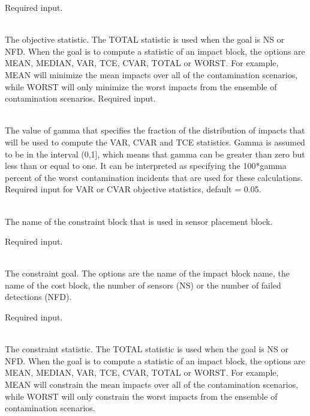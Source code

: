 \begin{description}[topsep=0pt,parsep=0.5em,itemsep=-0.4em]
\begin{description}[topsep=0pt,parsep=0.5em,itemsep=-0.4em]
				Required input.
    \item[{statistic}]\hfill
      \\The objective statistic. The TOTAL
      statistic is used when the goal is NS                             or
      NFD. When the goal is to compute a                             statistic
      of an impact block, the options                             are MEAN,
      MEDIAN, VAR, TCE, CVAR, TOTAL                             or WORST. For
      example, MEAN will minimize                             the mean impacts
      over all of the                             contamination scenarios,
      while WORST                             will only minimize the worst
      impacts                             from the ensemble of contamination
      scenarios.                                  Required input.
    \item[{gamma}]\hfill
      \\The value of gamma that specifies the                 fraction of the
      distribution of impacts that will                 be used to compute the
      VAR, CVAR and TCE statistics.                 Gamma is assumed to be in
      the interval (0,1], which means                  that gamma can be
      greater than zero but less than or equal to one. It                 can
      be interpreted as specifying the 100*gamma                 percent of
      the worst contamination incidents that                 are used for
      these calculations.                  Required input for VAR or CVAR
      objective statistics,                 default = 0.05.
  \end{description}
  \item[{constraint}]\hfill
  \begin{description}[topsep=0pt,parsep=0.5em,itemsep=-0.4em]
    \item[{name}]\hfill
\\The name of the constraint block that is used in sensor placement block.
                
                Required input.
    \item[{goal}]\hfill
\\The constraint goal. The options are the name of the impact block name, 
                the name of the cost block, the number of sensors (NS) or the number of failed detections (NFD).
                
                Required input.
    \item[{statistic}]\hfill
\\The constraint statistic. The TOTAL
                statistic is used when the goal is NS
                or NFD. When the goal is to compute a
                statistic of an impact block, the options
                are MEAN, MEDIAN, VAR, TCE, CVAR, TOTAL
                or WORST. For example, MEAN will constrain
                the mean impacts over all of the
                contamination scenarios, while WORST
                will only constrain the worst impacts
                from the ensemble of contamination
                scenarios.


\end{description}
\end{description}
